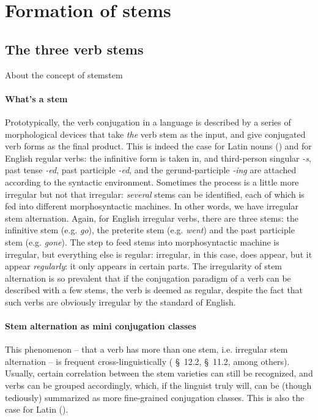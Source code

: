 \documentclass[a4paper, oneside]{report}
\newcommand*{\citesec}[1]{\S~{#1}}
\newcommand{\form}[1]{\emph{#1}}
\begin{document}
\section{Formation of stems}\label{sec:verb-inflection.stem}

\subsection{The three verb stems}\label{sec:three-latin-stem}

\begin{theorybox}{About the concept of stem}{stem}
    \paragraph*{What's a stem} Prototypically, the verb conjugation in a language is described by 
    a series of morphological devices that take \emph{the} verb stem as the input,
    and give conjugated verb forms as the final product.
    This is indeed the case for Latin nouns ()
    and for English regular verbs:
    the infinitive form is taken in,
    and third-person singular \form{-s}, past tense \form{-ed}, 
    past participle \form{-ed}, and the gerund-participle \form{-ing}
    are attached according to the syntactic environment.
    Sometimes the process is a little more irregular but not that irregular:
    \emph{several} stems can be identified, each of which is fed into different morphosyntactic machines.
    In other words, we have irregular stem alternation.
    Again, for English irregular verbs,
    there are three stems: the infinitive stem (e.g. \form{go}), 
    the preterite stem (e.g. \form{went})
    and the past participle stem (e.g. \form{gone}).
    The step to feed stems into morphosyntactic machine is irregular,
    but everything else is regular:
    irregular, in this case, does appear, but it appear \emph{regularly}:
    it only appears in certain parts.
    The irregularity of stem alternation is so prevalent
    that if the conjugation paradigm of a verb can be described with a few stems,
    the verb is deemed as regular, 
    despite the fact that such verbs are obviously irregular by the standard of English.

    \paragraph*{Stem alternation as mini conjugation classes} 
    This phenomenon -- that a verb has more than one stem, i.e. irregular stem alternation
    -- is frequent cross-linguistically
    (\citealt{jacques2021grammar} \citesec{12.2}, \citealt{forker2020grammar} \citesec{11.2}, among others).
    Usually, certain correlation between the stem varieties can still be recognized,
    and verbs can be grouped accordingly,
    which, if the linguist truly will, 
    can be (though tediously) summarized as more fine-grained conjugation classes.
    This is also the case for Latin ().


\end{theorybox}
\end{document}
